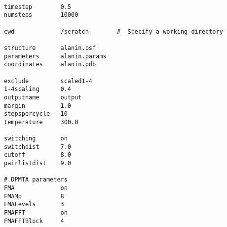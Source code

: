 \begin{verbatim}

timestep        0.5
numsteps        10000

cwd             /scratch        #  Specify a working directory 

structure       alanin.psf
parameters      alanin.params
coordinates     alanin.pdb

exclude         scaled1-4
1-4scaling      0.4
outputname      output
margin          1.0
stepspercycle   10
temperature     300.0

switching       on
switchdist      7.0
cutoff          8.0
pairlistdist    9.0

# DPMTA parameters
FMA             on
FMAMp           8
FMALevels       3
FMAFFT          on
FMAFFTBlock     4

\end{verbatim}
\newpage
